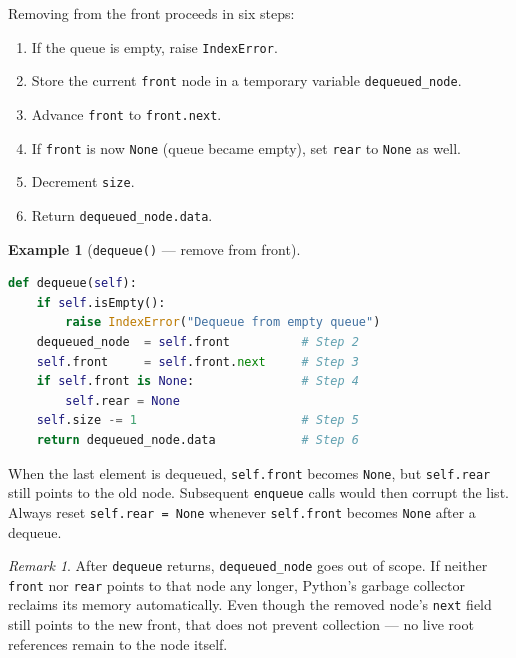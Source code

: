 \documentclass[11pt, a4paper, notitlepage]{report}
\theoremstyle{definition}
\theoremstyle{remark}
\newtheorem{remark}[theorem]{Remark}
\theoremstyle{definition}
\newtheorem{example}[theorem]{Example}
\begin{document}
Removing from the front proceeds in six steps:

\begin{enumerate}
  \item If the queue is empty, raise \texttt{IndexError}.
  \item Store the current \texttt{front} node in a temporary variable \texttt{dequeued\_node}.
  \item Advance \texttt{front} to \texttt{front.next}.
  \item If \texttt{front} is now \texttt{None} (queue became empty), set \texttt{rear} to
        \texttt{None} as well.
  \item Decrement \texttt{size}.
  \item Return \texttt{dequeued\_node.data}.
\end{enumerate}

\begin{example}[\texttt{dequeue()} --- remove from front]
\label{ex:queue-dequeue}
\leavevmode
\begin{lstlisting}[language=Python]
def dequeue(self):
    if self.isEmpty():
        raise IndexError("Dequeue from empty queue")
    dequeued_node  = self.front          # Step 2
    self.front     = self.front.next     # Step 3
    if self.front is None:               # Step 4
        self.rear = None
    self.size -= 1                       # Step 5
    return dequeued_node.data            # Step 6
\end{lstlisting}
\end{example}

\begin{warning}[title={Warning: Forgetting to Reset \texttt{rear} on Last Dequeue}]
When the last element is dequeued, \texttt{self.front} becomes \texttt{None}, but
\texttt{self.rear} still points to the old node.  Subsequent \texttt{enqueue} calls would then
corrupt the list.  Always reset \texttt{self.rear = None} whenever \texttt{self.front} becomes
\texttt{None} after a dequeue.
\end{warning}

\begin{remark}
After \texttt{dequeue} returns, \texttt{dequeued\_node} goes out of scope.  If neither
\texttt{front} nor \texttt{rear} points to that node any longer, Python's garbage collector
reclaims its memory automatically.  Even though the removed node's \texttt{next} field still
points to the new front, that does not prevent collection --- no live root references remain to
the node itself.
\end{remark}
\end{document}
